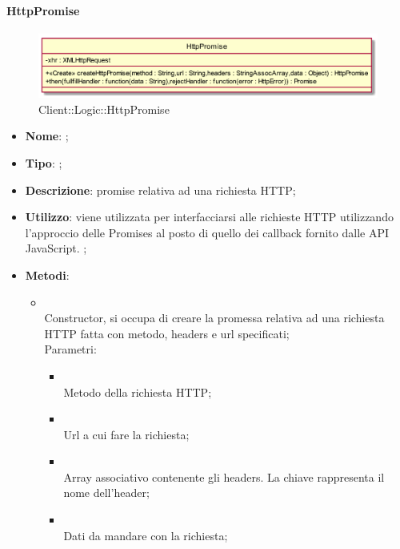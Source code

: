 \hypertarget{HttpPromise_label}{\paragraph{HttpPromise}}
\begin{figure}[h]
	\centering
	\includegraphics[width=\textwidth,height=\textheight,keepaspectratio]{images/ClassHttpPromise.png}
	\caption{Client::Logic::HttpPromise}
\end{figure}
\begin{itemize}
	\item \textbf{Nome}: ;
	\item \textbf{Tipo}: ;
	\item \textbf{Descrizione}: promise relativa ad una richiesta HTTP;
	\item \textbf{Utilizzo}: viene utilizzata per interfacciarsi alle richieste HTTP utilizzando l'approccio delle Promises al posto di quello dei callback fornito dalle API JavaScript. ;
	\item \textbf{Metodi}:
	\begin{itemize}
		\item[]  \\
		Constructor, si occupa di creare la promessa relativa ad una richiesta HTTP fatta con metodo, headers e url specificati;\\
		Parametri:
		\begin{itemize}
			\item {} \\
			Metodo della richiesta HTTP;
			\item {} \\
			Url a cui fare la richiesta;
			\item {} \\
			Array associativo contenente gli headers. La chiave rappresenta il nome dell'header;
			\item {} \\
			Dati da mandare con la richiesta;
		\end{itemize}

\end{itemize}
\end{itemize}
